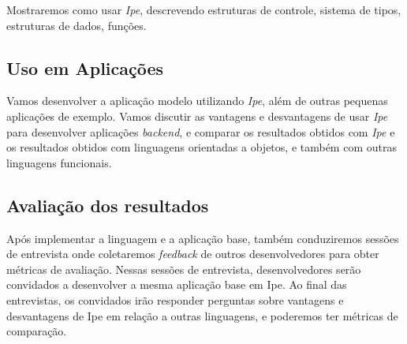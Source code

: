 Mostraremos como usar \textit{Ipe}, descrevendo estruturas de controle, sistema
de tipos, estruturas de dados, funções.

\subsection{Uso em Aplicações}

Vamos desenvolver a aplicação modelo utilizando \textit{Ipe}, além de outras
pequenas aplicações de exemplo. Vamos discutir as vantagens e desvantagens de
usar \textit{Ipe} para desenvolver aplicações \textit{backend}, e comparar os
resultados obtidos com \textit{Ipe} e os resultados obtidos com linguagens orientadas
a objetos, e também com outras linguagens funcionais.

\subsection{Avaliação dos resultados}

Após implementar a linguagem e a aplicação base, também conduziremos sessões
de entrevista onde coletaremos \textit{feedback} de outros desenvolvedores para
obter métricas de avaliação. Nessas sessões de entrevista, desenvolvedores serão
convidados a desenvolver a mesma aplicação base em Ipe. Ao final das entrevistas,
os convidados irão responder perguntas sobre vantagens e desvantagens de Ipe em
relação a outras linguagens, e poderemos ter métricas de comparação.

